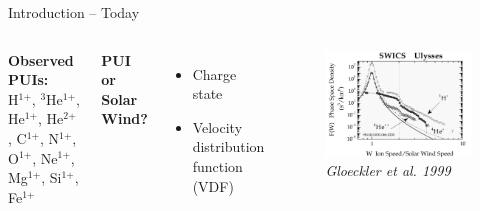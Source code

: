 \documentclass{beamer}
\newcommand{\textoverscript}[1]{$^{\text{#1}}$}
\begin{document}
\begin{frame}{Introduction -- Today}
\begin{columns}
	\column{4cm}
		\textbf{Observed PUIs:} \\H\textoverscript{1+}, \textoverscript{3}He\textoverscript{1+}, He\textoverscript{1+}, He\textoverscript{2+}, C\textoverscript{1+}, N\textoverscript{1+}, O\textoverscript{1+}, Ne\textoverscript{1+}, Mg\textoverscript{1+}, Si\textoverscript{1+}, Fe\textoverscript{1+}

		\vspace{0.7cm}
		\textbf{PUI or Solar Wind?}
		\begin{itemize}
			\item Charge state
			\item Velocity distribution function (VDF)
		\end{itemize}
	\column{6cm}
		\flushright
		\begin{figure}
			\includegraphics[scale=0.23]{pictures/sw_pui_gloeckler.png}
			\caption{\tiny{\textit{Gloeckler et al. 1999}}}
		\end{figure}
\end{columns}
\end{frame}
\end{document}
